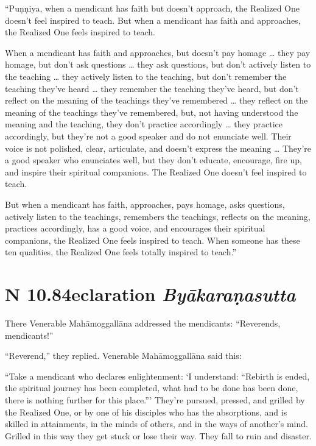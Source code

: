 \documentclass[12pt,openany]{book}%
\newcommand*{\suttatitleacronym}[1]{\smaller[2]{#1}\vspace*{.3em}}
\newcommand*{\suttatitletranslation}[1]{\linebreak{#1}}
\newcommand*{\suttatitleroot}[1]{\linebreak\smaller[2]\itshape{#1}}
\newcommand*{\tocacronym}[1]{\hspace*{-3.3em}{#1}\quad}
\newcommand*{\toctranslation}[1]{#1}
\newcommand*{\tocroot}[1]{(\textit{#1})}
\begin{document}
“\textsanskrit{Puṇṇiya}, when a mendicant has faith but doesn’t approach, the Realized One doesn’t feel inspired to teach. But when a mendicant has faith and approaches, the Realized One feels inspired to teach. 

When a mendicant has faith and approaches, but doesn’t pay homage … they pay homage, but don’t ask questions … they ask questions, but don’t actively listen to the teaching … they actively listen to the teaching, but don’t remember the teaching they’ve heard … they remember the teaching they’ve heard, but don’t reflect on the meaning of the teachings they’ve remembered … they reflect on the meaning of the teachings they’ve remembered, but, not having understood the meaning and the teaching, they don’t practice accordingly … they practice accordingly, but they’re not a good speaker and do not enunciate well. Their voice is not polished, clear, articulate, and doesn’t express the meaning … They’re a good speaker who enunciates well, but they don’t educate, encourage, fire up, and inspire their spiritual companions. The Realized One doesn’t feel inspired to teach. 

But when a mendicant has faith, approaches, pays homage, asks questions, actively listen to the teachings, remembers the teachings, reflects on the meaning, practices accordingly, has a good voice, and encourages their spiritual companions, the Realized One feels inspired to teach. When someone has these ten qualities, the Realized One feels totally inspired to teach.” 

%
\section*{{\suttatitleacronym AN 10.84}{\suttatitletranslation Declaration }{\suttatitleroot Byākaraṇasutta}}
\addcontentsline{toc}{section}{\tocacronym{AN 10.84} \toctranslation{Declaration } \tocroot{Byākaraṇasutta}}

There Venerable \textsanskrit{Mahāmoggallāna} addressed the mendicants: “Reverends, mendicants!” 

“Reverend,” they replied. Venerable \textsanskrit{Mahāmoggallāna} said this: 

“Take a mendicant who declares enlightenment: ‘I understand: “Rebirth is ended, the spiritual journey has been completed, what had to be done has been done, there is nothing further for this place.”’ They’re pursued, pressed, and grilled by the Realized One, or by one of his disciples who has the absorptions, and is skilled in attainments, in the minds of others, and in the ways of another’s mind. Grilled in this way they get stuck or lose their way. They fall to ruin and disaster. 
\end{document}
